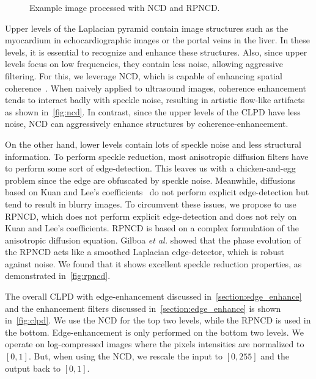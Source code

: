 \begin{figure}[t]
{  }
  \caption{Example image processed with NCD and RPNCD.}\label{fig:ncd_liver}
  \vspace{-0.1in}
\end{figure}
%

Upper levels of the Laplacian pyramid contain image structures such as the myocardium in echocardiographic images or the portal veins in the liver.
In these levels, it is essential to recognize and enhance these structures.
Also, since upper levels focus on low frequencies, they contain less noise, allowing aggressive filtering.
For this, we leverage NCD, which is capable of enhancing spatial coherence~\cite{weickert_coherenceenhancing_1999}.
When naively applied to ultrasound images, coherence enhancement tends to interact badly with speckle noise, resulting in artistic flow-like artifacts as shown in~\cref{fig:ncd}.
In contrast, since the upper levels of the CLPD have less noise, NCD can aggressively enhance structures by coherence-enhancement.

On the other hand, lower levels contain lots of speckle noise and less structural information.
To perform speckle reduction, most anisotropic diffusion filters have to perform some sort of edge-detection.
This leaves us with a chicken-and-egg problem since the edge are obfuscated by speckle noise.
Meanwhile, diffusions based on Kuan and Lee's coefficients~\cite{yongjianyu_speckle_2002, aja-fernandez_estimation_2006, krissian_oriented_2007} do not perform explicit edge-detection but tend to result in blurry images.
To circumvent these issues, we propose to use RPNCD, which does not perform explicit edge-detection and does not rely on Kuan and Lee's coefficients.
RPNCD is based on a complex formulation of the anisotropic diffusion equation.
Gilboa \textit{et al.} showed that the phase evolution of the RPNCD acts like a smoothed Laplacian edge-detector, which is robust against noise.
We found that it shows excellent speckle reduction properties, as demonstrated in~\cref{fig:rpncd}.

The overall CLPD with edge-enhancement discussed in~\cref{section:edge_enhance} and the enhancement filters discussed in~\cref{section:edge_enhance} is shown in~\cref{fig:clpd}.
We use the NCD for the top two levels, while the RPNCD is used in the bottom.
Edge-enhancement is only performed on the bottom two levels.
We operate on log-compressed images where the pixels intensities are normalized to \([0, 1]\).
But, when using the NCD, we rescale the input to \([0, 255]\) and the output back to \([0, 1]\).

